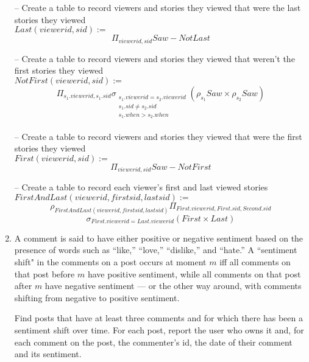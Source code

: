 \documentclass{article}
\newcommand{\var}[1]{\mathit{#1}}
\begin{document}
\begin{enumerate}
{    -- Create a table to record viewers and stories they viewed that were the last stories they viewed \\
    $\var{Last}(viewerid,sid):=$
    \[
        \Pi_{viewerid,sid} \var{Saw} - NotLast
    \]
    
    -- Create a table to record viewers and stories they viewed that weren't the first stories they viewed \\
    $\var{NotFirst}(viewerid,sid):=$
    \[
        \Pi_{s_1.viewerid,s_1.sid} 
        \sigma_{
            \substack{
                s_1.viewerid = s_2.viewerid \\
                s_1.sid \ne s_2.sid \\
                s_1.when > s_2.when \\
            }
        } 
        (\rho_{s_1} \var{Saw} \times \rho_{s_2} \var{Saw}) 
    \]
    
    -- Create a table to record viewers and stories they viewed that were the first stories they viewed \\
    $\var{First}(viewerid,sid):=$
    \[
        \Pi_{viewerid,sid} \var{Saw} - NotFirst
    \]
    
    -- Create a table to record each viewer's first and last viewed stories \\
    $\var{FirstAndLast}(viewerid,firstsid,lastsid) :=$
    \[
        \rho_{\var{FirstAndLast}(viewerid,firstsid,lastsid)}
        \Pi_{First.viewerid, First.sid, Second.sid}
    \]
    \[
        \sigma_{
                First.viewerid = Last.viewerid
        }
        (\var{First} \times \var{Last})
    \] 
    
    
    }





\item   %
A comment is said to have either positive or negative sentiment
based on the presence of words such as ``like,'' ``love,'' ``dislike,'' and ``hate.'' 
A ``sentiment shift" in the comments on a post occurs at moment $m$ iff
all comments on that post before $m$ have positive sentiment, 
while all comments on that post after $m$ have negative sentiment ---
or the other way around, with comments shifting from negative to positive sentiment.

Find posts that have at least three comments and for which there has been a sentiment shift over time. 
For each post, report the user who owns it and,
for each comment on the post,
the commenter's id, 
the date of their comment and its sentiment.


\end{enumerate}
\end{document}
